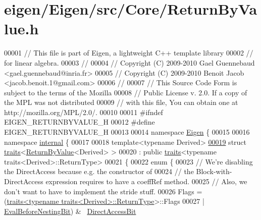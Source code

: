 \hypertarget{eigen_2_eigen_2src_2_core_2_return_by_value_8h_source}{}\section{eigen/\+Eigen/src/\+Core/\+Return\+By\+Value.h}
\label{eigen_2_eigen_2src_2_core_2_return_by_value_8h_source}

\begin{DoxyCode}
00001 \textcolor{comment}{// This file is part of Eigen, a lightweight C++ template library}
00002 \textcolor{comment}{// for linear algebra.}
00003 \textcolor{comment}{//}
00004 \textcolor{comment}{// Copyright (C) 2009-2010 Gael Guennebaud <gael.guennebaud@inria.fr>}
00005 \textcolor{comment}{// Copyright (C) 2009-2010 Benoit Jacob <jacob.benoit.1@gmail.com>}
00006 \textcolor{comment}{//}
00007 \textcolor{comment}{// This Source Code Form is subject to the terms of the Mozilla}
00008 \textcolor{comment}{// Public License v. 2.0. If a copy of the MPL was not distributed}
00009 \textcolor{comment}{// with this file, You can obtain one at http://mozilla.org/MPL/2.0/.}
00010 
00011 \textcolor{preprocessor}{#ifndef EIGEN\_RETURNBYVALUE\_H}
00012 \textcolor{preprocessor}{#define EIGEN\_RETURNBYVALUE\_H}
00013 
00014 \textcolor{keyword}{namespace }\hyperlink{namespace_eigen}{Eigen} \{
00015 
00016 \textcolor{keyword}{namespace }\hyperlink{namespaceinternal}{internal} \{
00017 
00018 \textcolor{keyword}{template}<\textcolor{keyword}{typename} Derived>
\hyperlink{struct_eigen_1_1internal_1_1traits_3_01_return_by_value_3_01_derived_01_4_01_4}{00019} \textcolor{keyword}{struct }\hyperlink{struct_eigen_1_1internal_1_1traits}{traits}<\hyperlink{group___core___module_class_eigen_1_1_return_by_value}{ReturnByValue}<Derived> >
00020   : \textcolor{keyword}{public} \hyperlink{struct_eigen_1_1internal_1_1traits}{traits}<typename traits<Derived>::ReturnType>
00021 \{
00022   \textcolor{keyword}{enum} \{
00023     \textcolor{comment}{// We're disabling the DirectAccess because e.g. the constructor of}
00024     \textcolor{comment}{// the Block-with-DirectAccess expression requires to have a coeffRef method.}
00025     \textcolor{comment}{// Also, we don't want to have to implement the stride stuff.}
00026     Flags = (\hyperlink{struct_eigen_1_1internal_1_1traits}{traits<typename traits<Derived>::ReturnType}>::Flags
00027              | \hyperlink{group__flags_gaa34e83bae46a8eeae4e69ebe3aaecbed}{EvalBeforeNestingBit}) & ~\hyperlink{group__flags_gabf1e9d0516a933445a4c307ad8f14915}{DirectAccessBit}

\end{DoxyCode}
